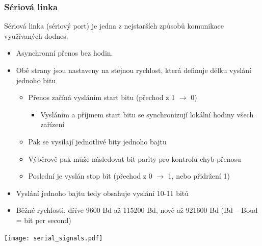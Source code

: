 \documentclass{beamer}
\begin{document}
\begin{frame}
\frametitle{Sériová linka}

\footnotesize
Sériová linka (sériový port) je jedna z nejstarších způsobů komunikace využívaných dodnes.
\begin{itemize}
\footnotesize
\item Asynchronní přenos bez hodin.
\item Obě strany jsou nastaveny na stejnou rychlost, která definuje délku vyslání jednoho bitu
\begin{itemize}
\scriptsize
\item Přenos začíná vysláním start bitu (přechod z 1 $\rightarrow$ 0)
\begin{itemize}
\scriptsize
\item Vysláním a příjmem start bitu se synchronizují lokální hodiny všech zařízení
\end{itemize}
\scriptsize
\item Pak se vysílají jednotlivé bity jednoho bajtu
\item Výběrově pak může následovat bit parity pro kontrolu chyb přenosu
\item Poslední je vyslán stop bit (přechod z 0 $\rightarrow$ 1, nebo přidržení 1)
\end{itemize}
\footnotesize
\item Vyslání jednoho bajtu tedy obsahuje vyslání 10-11 bitů
\item Běžné rychlosti, dříve 9600 Bd až 115200 Bd, nově až 921600 Bd (Bd -- Boud = bit per second)
\end{itemize}

\begin{center}
\texttt{[image: serial\_signals.pdf]}
\end{center}
\end{frame}
\end{document}
